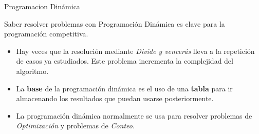\documentclass[10pt,handout]{beamer}
\begin{document}
\begin{frame}{Programacion Dinámica}

  Saber resolver problemas con Programación Dinámica es clave para la
  programación competitiva.

  \begin{itemize}
  \item Hay veces que la resolución mediante \emph{Divide y vencerás}
    lleva a la repetición de casos ya estudiados. Este problema
    incrementa la complejidad del algoritmo.

  \item La \textbf{base} de la programación dinámica es el uso de una
    \textbf{tabla} para ir almacenando los resultados que puedan
    usarse posteriormente.

  \item La programación dinámica normalmente se usa para resolver
    problemas de \emph{Optimización} y problemas de \emph{Conteo}.

  \end{itemize}
\end{frame}
\end{document}
